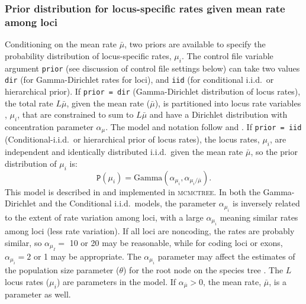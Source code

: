 \documentclass{book}
\numberwithin{equation}{section} \renewcommand{\baselinestretch}{0.55}
\begin{document}
\subsubsection{Prior distribution for locus-specific rates given mean rate among loci}
Conditioning on the mean rate $\bar\mu$, two priors are available to
specify the probability distribution of locus-specific rates, $\mu_i$.
The control file variable argument \texttt{prior} (see discussion of
control file settings below) can take two values \texttt{dir} (for
Gamma-Dirichlet rates for loci), and \texttt{iid} (for conditional
i.i.d.\ or hierarchical prior).  If \texttt{prior = dir}
(Gamma-Dirichlet distribution of locus rates), the total rate
$L\bar\mu$, given the mean rate ($\bar\mu$), is partitioned into locus
rate variables , $\mu_i$, that are constrained to sum to $L\bar\mu$
and have a Dirichlet distribution with concentration parameter
$\alpha_\mu$.  The model and notation follow
\citet[][eq.~4]{Burgess2008} and \citet[][eqs.~3-5]{dosReis2014}.  If
\texttt{prior = iid} (Conditional-i.i.d.\ or hierarchical prior of
locus rates), the locus rates, $\mu_i$, are independent and
identically distributed i.i.d.\ given the mean rate $\bar\mu$, so the
prior distribution of $\mu_i$ is:
\begin{displaymath}
  \mathtt{P}(\mu_i) = \textrm{Gamma}(\alpha_{\mu_i}, \alpha_{\mu_i/\bar{\mu}}).
\end{displaymath}
This model is described in \citet[][eq.~8]{Zhu2015} and implemented in
\textsc{mcmctree}.  In both the Gamma-Dirichlet and the Conditional
i.i.d.\ models, the parameter $\alpha_{\mu_i}$ is inversely related to
the extent of rate variation among loci, with a large $\alpha_{\mu_i}$
meaning similar rates among loci (less rate variation).  If all loci
are noncoding, the rates are probably similar, so $\alpha_{\mu_I} =$
10 or 20 may be reasonable, while for coding loci or exons,
$\alpha_{\mu_i} = 2$ or 1 may be appropriate.  The $\alpha_{\mu_i}$
parameter may affect the estimates of the population size parameter
($\theta$) for the root node on the species tree \citep{Burgess2008}.
The $L$ locus rates ($\mu_i$) are parameters in the model.  If
$\alpha_{\bar{\mu}} > 0$, the mean rate, $\bar\mu$, is a parameter as
well.
\end{document}
